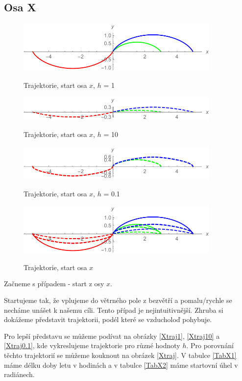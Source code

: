 \documentclass[reqno, a4paper]{amsart}
\numberwithin{equation}{section}
\begin{document}
\subsection{Osa X}
\label{sec: OsaX}

\begin{figure}
    \begin{minipage}{\linewidth}
    \centering
    \includegraphics[width=10cm]{figures/OsaX2.pdf}
    \caption{Trajektorie, start osa $x$, $h$ = 1}
    \label{Xtraj1}
    \includegraphics[width=10cm]{figures/OsaX3.pdf}
    \caption{Trajektorie, start osa $x$, $h$ = 10}
    \label{Xtraj10}
    \includegraphics[width=10cm]{figures/OsaX4.pdf}
    \caption{Trajektorie, start osa $x$, $h$ = 0.1}
    \label{Xtraj0.1}
    \includegraphics[width=10cm]{figures/OsaX1.pdf}
    \caption{Trajektorie, start osa $x$}
    \label{Xtraj}
\end{minipage}
\end{figure}

Začneme s případem - start z osy $x$.

Startujeme tak, že vplujeme do větrného pole z bezvětří a pomalu/rychle se necháme unášet k našemu cíli. Tento případ je nejintuitivnější. Zhruba si dokážeme představit trajektorii, podél které se vzducholoď pohybuje.

Pro lepší představu se můžeme podívat na obrázky \eqref{Xtraj1}, \eqref{Xtraj10} a \eqref{Xtraj0.1}, kde vykreslujeme trajektorie pro různé hodnoty $h$. Pro porovnání těchto trajektorií se můžeme kouknout na obrázek \eqref{Xtraj}. V tabulce \eqref{TabX1} máme délku doby letu v hodinách a v tabulce \eqref{TabX2} máme startovní úhel v radiánech.
\end{document}
